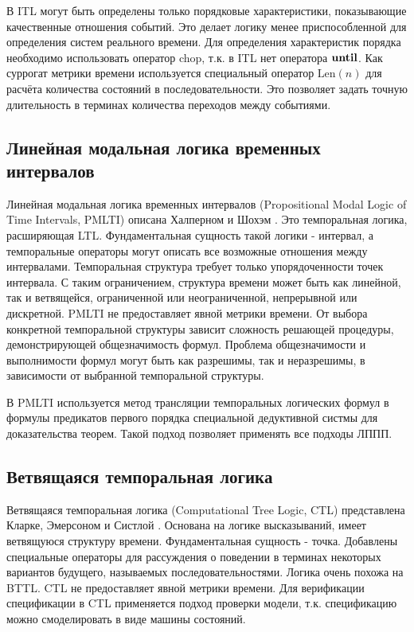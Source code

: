 		 В ITL могут быть определены только порядковые характеристики, показывающие качественные отношения событий.
		 Это делает логику менее приспособленной для определения систем реального времени.
		 Для определения характеристик порядка необходимо использовать оператор chop, т.к. в ITL нет оператора $ \text{\textbf{until}} $.
		 Как суррогат метрики времени используется специальный оператор $ \text{Len}(n) $ для расчёта количества состояний в последовательности.
		 Это позволяет задать точную длительность в терминах количества переходов между событиями.
		\subsection{Линейная модальная логика временных интервалов}
			Линейная модальная логика временных интервалов (Propositional Modal Logic of Time Intervals, PMLTI) описана Халперном и Шохэм \cite{PMLTI}.
			Это темпоральная логика, расширяющая LTL.
			Фундаментальная сущность такой логики - интервал, а темпоральные операторы могут описать все возможные отношения между интервалами.
			Темпоральная структура требует только упорядоченности точек интервала. С таким ограничением, структура времени может быть как линейной, так и ветвящейся, ограниченной или неограниченной, непрерывной или дискретной. 
			PMLTI не предоставляет явной метрики времени.
			От выбора конкретной темпоральной структуры зависит сложность решающей процедуры, демонстрирующей общезначимость формул.
			Проблема общезначимости и выполнимости формул могут быть как разрешимы, так и неразрешимы, в зависимости от выбранной темпоральной структуры.
			
			В PMLTI используется метод трансляции темпоральных логических формул в формулы предикатов первого порядка специальной дедуктивной систмы для доказательства теорем.
			Такой подход позволяет применять все подходы  ЛППП.
			
		\subsection{Ветвящаяся темпоральная логика}
		 Ветвящаяся темпоральная логика (Computational Tree Logic, CTL) представлена Кларке, Эмерсоном и Систлой \cite{Clarke} \cite{ClarkeGrumberg}. 
		 Основана на логике высказываний, имеет ветвящуюся структуру времени.
		 Фундаментальная сущность - точка.
		 Добавлены специальные операторы для рассуждения о поведении в терминах некоторых вариантов будущего, называемых последовательностями.
		 Логика очень похожа на BTTL.
		 CTL не предоставляет явной метрики времени.
		 Для верификации спецификации в CTL применяется подход проверки модели, т.к. спецификацию можно смоделировать в виде машины состояний.
